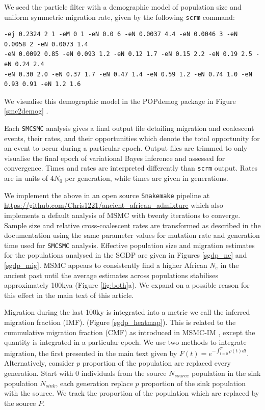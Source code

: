 \documentclass{article}
\begin{document}
We seed the particle filter with a demographic model of population size and uniform symmetric migration rate, given by the following {\tt scrm} command:

{\small 
\begin{verbatim}
-ej 0.2324 2 1 -eM 0 1 -eN 0.0 6 -eN 0.0037 4.4 -eN 0.0046 3 -eN 0.0058 2 -eN 0.0073 1.4 
-eN 0.0092 0.85 -eN 0.093 1.2 -eN 0.12 1.7 -eN 0.15 2.2 -eN 0.19 2.5 -eN 0.24 2.4 
-eN 0.30 2.0 -eN 0.37 1.7 -eN 0.47 1.4 -eN 0.59 1.2 -eN 0.74 1.0 -eN 0.93 0.91 -eN 1.2 1.6
\end{verbatim}
}

We visualise this demographic model in the POPdemog package in Figure \ref{smc2demog} \cite{Zhou2018}.

Each {\tt SMCSMC} analysis gives a final output file detailing migration and coalescent events, their rates, and their opportunities which denote the total opportunity for an event to occur during a particular epoch. Output files are trimmed to only visualise the final epoch of variational Bayes inference and assessed for convergence. Times and rates are interpreted differently than {\tt scrm} output. Rates are in units of $4N_0$ per generation, while times are given in generations. 

We implement the above in an open source {\tt Snakemake} pipeline at \url{https://github.com/Chris1221/ancient_african_admixture} which also implements a default analysis of MSMC with twenty iterations to converge. Sample size and relative cross-coalescent rates are transformed as described in the documentation using the same parameter values for mutation rate and generation time used for {\tt SMCSMC} analysis. Effective population size and migration estimates for the populations analysed in the SGDP are given in Figures \ref{sgdp_ne} and \ref{sgdp_mig}. MSMC appears to consistently find a higher African $N_e$ in the ancient past until the average estimates across populations stabilises approximately 100kya (Figure \ref{fig:both}a). We expand on a possible reason for this effect in the main text of this article.


Migration during the last 100ky is integrated into a metric we call the inferred migration fraction (IMF). (Figure \ref{sgdp_heatmap}). This is related to the cummulative migration fraction (CMF) as introduced in MSMC-IM \cite{Wang2019a}, except the quantity is integrated in a particular epoch. We use two methods to integrate migration, the first presented in the main text given by $F(t) = e^{- \int_{t=0}^T \rho(t) dt}$. Alternatively, consider $p$ proportion of the population are replaced every generation. Start with 0 individuals from the source $N_{source}$ population in the sink population $N_{sink}$, each generation replace $p$ proportion of the sink population with the source. We track the proportion of the population which are replaced by the source $P$.  
\end{document}
